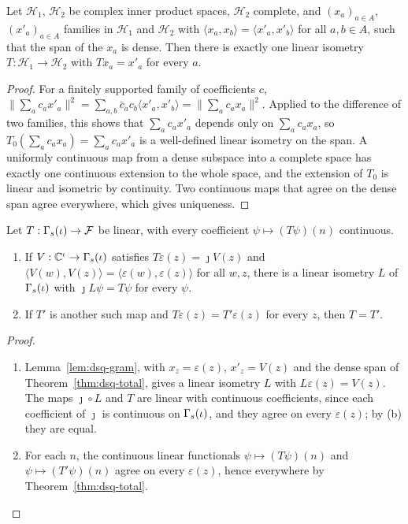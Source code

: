 \begin{veteenv}
\begin{lemma}\label{lem:dsq-gram}
Let $\mathcal H_1$, $\mathcal H_2$ be complex inner product spaces, $\mathcal H_2$ complete, and $(x_a)_{a\in A}$,
$(x'_a)_{a\in A}$ families in $\mathcal H_1$ and $\mathcal H_2$ with $\langle x_a,x_b\rangle=\langle x'_a,x'_b\rangle$ for all
$a,b\in A$, such that the span of the $x_a$ is dense. Then there is exactly one linear isometry $T:\mathcal H_1\to\mathcal
H_2$ with $Tx_a=x'_a$ for every $a$.
\end{lemma}

\begin{proof}
For a finitely supported family of coefficients $c$, $\lVert\sum_ac_ax'_a\rVert^2=\sum_{a,b}\bar c_ac_b\langle
x'_a,x'_b\rangle=\lVert\sum_ac_ax_a\rVert^2$. Applied to the difference of two families, this shows that
$\sum_ac_ax'_a$ depends only on $\sum_ac_ax_a$, so $T_0(\sum_ac_ax_a)=\sum_ac_ax'_a$ is a well-defined linear isometry on the
span. A uniformly continuous map from a dense subspace into a complete space has exactly one continuous extension to the
whole space, and the extension of $T_0$ is linear and isometric by continuity. Two continuous maps that agree on the
dense span agree everywhere, which gives uniqueness.
\end{proof}

\begin{lemma}\label{lem:dsq-extension}
Let $T:\Gamma_s(\iota)\to\mathcal F$ be linear, with every coefficient $\psi\mapsto(T\psi)(n)$ continuous.
\begin{enumerate}
\item[(a)] If $V:\mathbb C^\iota\to\Gamma_s(\iota)$ satisfies $T\varepsilon(z)=\jmath V(z)$ and $\langle V(w),V(z)\rangle=\langle\varepsilon(w),
\varepsilon(z)\rangle$ for all $w,z$, there is a linear isometry $L$ of $\Gamma_s(\iota)$ with $\jmath L\psi=T\psi$ for every $\psi$.
\item[(b)] If $T'$ is another such map and $T\varepsilon(z)=T'\varepsilon(z)$ for every $z$, then $T=T'$.
\end{enumerate}
\end{lemma}

\begin{proof}
\begin{enumerate}
\item[(a)] Lemma~\ref{lem:dsq-gram}, with $x_z=\varepsilon(z)$, $x'_z=V(z)$ and the dense span of Theorem~\ref{thm:dsq-total}, gives
a linear isometry $L$ with $L\varepsilon(z)=V(z)$. The maps $\jmath\circ L$ and $T$ are linear with continuous coefficients,
since each coefficient of $\jmath$ is continuous on $\Gamma_s(\iota)$, and they agree on every $\varepsilon(z)$; by (b) they are equal.
\item[(b)] For each $n$, the continuous linear functionals $\psi\mapsto(T\psi)(n)$ and $\psi\mapsto(T'\psi)(n)$ agree on every
$\varepsilon(z)$, hence everywhere by Theorem~\ref{thm:dsq-total}.\qedhere
\end{enumerate}
\end{proof}


\end{veteenv}
